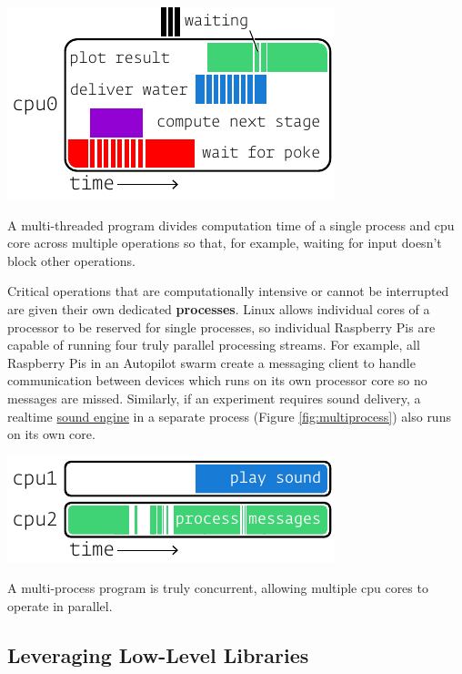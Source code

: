 \documentclass[nohyper, justified, notitlepage, marginals=raggedright,twoside=false,debug]{tufte-autopilot}
\begin{document}
\begin{marginfigure}
\includegraphics[]{figures/side_13_multithread.pdf}
\caption{A multi-threaded program divides computation time of a single process and cpu core across multiple operations so that, for example, waiting for input doesn't block other operations.}
\label{fig:multithread}
\end{marginfigure}

Critical operations that are computationally intensive or cannot be interrupted are given their own dedicated \textbf{processes}. Linux allows individual cores of a processor to be reserved for single processes, so individual Raspberry Pis are capable of running four truly parallel processing streams. For example, all Raspberry Pis in an Autopilot swarm create a messaging client to handle communication between devices which runs on its own processor core so no messages are missed. Similarly, if an experiment requires sound delivery, a realtime \hyperref[sec:stim]{sound engine} in a separate process (Figure \ref{fig:multiprocess}) also runs on its own core.

\begin{marginfigure}[0.1cm]
 \includegraphics[]{figures/side_14_multiprocess.pdf}
 \caption{A multi-process program is truly concurrent, allowing multiple cpu cores to operate in parallel.}
 \label{fig:multiprocess}
\end{marginfigure}

\subsection{Leveraging Low-Level Libraries}
\label{sec:lowlevel}
\end{document}
